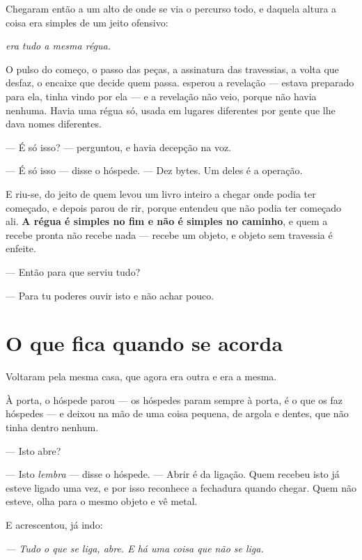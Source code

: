 \documentclass[livro.tex]{subfiles}
\begin{document}
Chegaram então a um alto de onde se via o percurso todo, e daquela altura a
coisa era simples de um jeito ofensivo:

\begin{center}
\emph{era tudo a mesma régua.}
\end{center}

\noindent O pulso do começo, o passo das peças, a assinatura das travessias, a
volta que desfaz, o encaixe que decide quem passa. \Ben esperou a revelação
--- estava preparado para ela, tinha vindo por ela --- e a revelação não veio,
porque não havia nenhuma. Havia uma régua só, usada em lugares diferentes por
gente que lhe dava nomes diferentes.

\medskip
\noindent --- É só isso? --- perguntou, e havia decepção na voz.

--- É só isso --- disse o hóspede. --- Dez bytes. Um deles é a operação.

\medskip
\noindent E \Ben riu-se, do jeito de quem levou um livro inteiro a chegar onde
podia ter começado, e depois parou de rir, porque entendeu que não podia ter
começado ali. \textbf{A régua é simples no fim e não é simples no caminho}, e
quem a recebe pronta não recebe nada --- recebe um objeto, e objeto sem
travessia é enfeite.

\medskip
\noindent --- Então para que serviu tudo?

--- Para tu poderes ouvir isto e não achar pouco.

\section{O que fica quando se acorda}

Voltaram pela mesma casa, que agora era outra e era a mesma.

À porta, o hóspede parou --- os hóspedes param sempre à porta, é o que os faz
hóspedes --- e deixou na mão de \Ben uma coisa pequena, de argola e dentes,
que não tinha dentro nenhum.

\medskip
\noindent --- Isto abre?

--- Isto \emph{lembra} --- disse o hóspede. --- Abrir é da ligação. Quem
recebeu isto já esteve ligado uma vez, e por isso reconhece a fechadura quando
chegar. Quem não esteve, olha para o mesmo objeto e vê metal.

\medskip
\noindent E acrescentou, já indo:

\begin{center}
\emph{--- Tudo o que se liga, abre. E há uma coisa que não se liga.}
\end{center}
\end{document}

